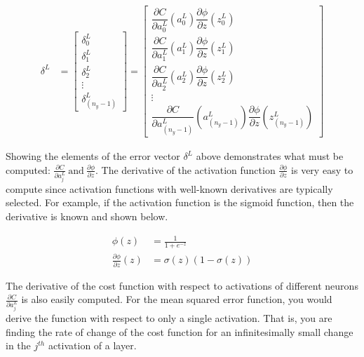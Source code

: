 \documentclass{article}
\begin{document}
\begin{align}
	\delta^{L} & =
	\begin{bmatrix}
		\delta_0^{L} \\
		\delta_1^{L} \\
		\delta_2^{L} \\
		\vdots       \\
		\delta_{(n_{y} - 1)}^{L}
	\end{bmatrix}
	=
	\begin{bmatrix}
		\dfrac{\partial C}{\partial a_{0}^{L}}(a_{0}^{L}) \dfrac{\partial \phi}{\partial z}(z_{0}^{L}) \\
		\dfrac{\partial C}{\partial a_{1}^{L}}(a_{1}^{L}) \dfrac{\partial \phi}{\partial z}(z_{1}^{L}) \\
		\dfrac{\partial C}{\partial a_{2}^{L}}(a_{2}^{L}) \dfrac{\partial \phi}{\partial z}(z_{2}^{L}) \\
		\vdots                                                                                         \\
		\dfrac{\partial C}{\partial a_{(n_{y} - 1)}^{L}}(a_{(n_{y} - 1)}^{L}) \dfrac{\partial \phi}{\partial z}(z_{(n_{y} - 1)}^{L})
	\end{bmatrix}
\end{align}

Showing the elements of the error vector $\delta^{L}$ above demonstrates what must be computed:
${\frac{\partial C}{\partial a_{j}^{L}}\ \text{and}\ \frac{\partial \phi}{\partial z}}$.
The derivative of the activation function $\frac{\partial \phi}{\partial z}$ is
very easy to compute since activation functions with well-known derivatives are
typically selected. For example, if the activation function is the sigmoid function,
then the derivative is known and shown below.

\begin{align}
	\phi(z)                             & = \frac{1}{1 + e^{-z}}      \\
	\frac{\partial \phi}{\partial z}(z) & = \sigma(z) (1 - \sigma(z))
\end{align}

The derivative of the cost function with respect to activations of different
neurons ${\frac{\partial C}{\partial a_{j}^{L}}}$ is also easily computed.
For the mean squared error function, you would derive the function with respect
to only a single activation. That is,
you are finding the rate of change of the cost function for an infinitesimally
small change in the $j^{th}$ activation of a layer.
\end{document}
